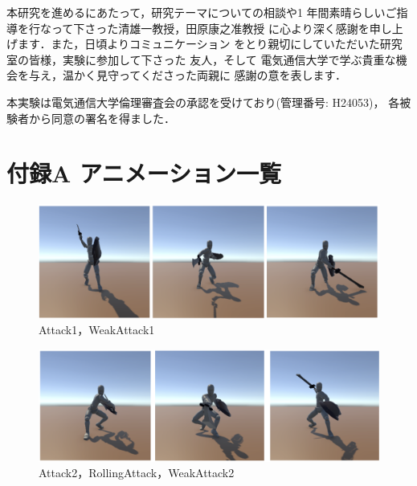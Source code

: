 \documentclass[a4paper,12pt,oneside,openany,titlepage]{jreport}
\begin{document}
本研究を進めるにあたって，研究テーマについての相談や1
年間素晴らしいご指導を行なって下さった清雄一教授，田原康之准教授
に心より深く感謝を申し上げます．また，日頃よりコミュニケーション
をとり親切にしていただいた研究室の皆様，実験に参加して下さった
友人，そして
電気通信大学で学ぶ貴重な機会を与え，温かく見守ってくださった両親に
感謝の意を表します．

本実験は電気通信大学倫理審査会の承認を受けており(管理番号: H24053)，
各被験者から同意の署名を得ました．
\newpage

\appendix
{}
\chapter*{付録A アニメーション一覧}
\thispagestyle{fancy}
\lhead{\leftmark}
\rhead{\thepage}

\renewcommand{\headrulewidth}{1pt}
\renewcommand{\thefigure}{A.\arabic{figure}} %




\begin{figure}[htbp]
  \begin{center}
    \includegraphics[width=13cm]{FrameImage/Attack1.png}
    \caption{Attack1，WeakAttack1}
    \label{}
  \end{center}
\end{figure}

\begin{figure}[htbp]
  \begin{center}
    \includegraphics[width=13cm]{FrameImage/Attack2_rolling.png}
    \caption{Attack2，RollingAttack，WeakAttack2}
    \label{}
  \end{center}
\end{figure}
\end{document}
